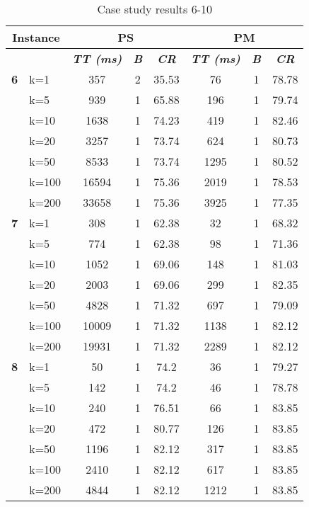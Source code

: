     \begin{table}[htbp]
    \caption{Case study results 6-10}
    \centering
    \begin{tabular}{|l|l|c|c|c|c|c|c|}
    \hline
    \multicolumn{ 2}{|c|}{\textbf{Instance}} & \multicolumn{ 3}{c|}{\textbf{PS}} & \multicolumn{ 3}{c|}{\textbf{PM}} \\ \hline
    \multicolumn{ 2}{|l|}{} & \textbf{\textit{TT (ms)}} & \textbf{\textit{B}} & \textbf{\textit{CR}} & \textbf{\textit{TT (ms)}} & \textbf{\textit{B}} & \textbf{\textit{CR}} \\ \hline
    \multicolumn{1}{|r|}{\textbf{6}} & k=1 & 357 & 2 & 35.53 & 76 & 1 & 78.78 \\ 
     & k=5 & 939 & 1 & 65.88 & 196 & 1 & 79.74 \\ 
     & k=10 & 1638 & 1 & 74.23 & 419 & 1 & 82.46 \\ 
     & k=20 & 3257 & 1 & 73.74 & 624 & 1 & 80.73 \\ 
     & k=50 & 8533 & 1 & 73.74 & 1295 & 1 & 80.52 \\ 
     & k=100 & 16594 & 1 & 75.36 & 2019 & 1 & 78.53 \\ 
     & k=200 & 33658 & 1 & 75.36 & 3925 & 1 & 77.35 \\ \hline
    \multicolumn{1}{|r|}{\textbf{7}} & k=1 & 308 & 1 & 62.38 & 32 & 1 & 68.32 \\ 
     & k=5 & 774 & 1 & 62.38 & 98 & 1 & 71.36 \\ 
     & k=10 & 1052 & 1 & 69.06 & 148 & 1 & 81.03 \\ 
     & k=20 & 2003 & 1 & 69.06 & 299 & 1 & 82.35 \\ 
     & k=50 & 4828 & 1 & 71.32 & 697 & 1 & 79.09 \\ 
     & k=100 & 10009 & 1 & 71.32 & 1138 & 1 & 82.12 \\ 
     & k=200 & 19931 & 1 & 71.32 & 2289 & 1 & 82.12 \\ \hline
    \multicolumn{1}{|r|}{\textbf{8}} & k=1 & 50 & 1 & 74.2 & 36 & 1 & 79.27 \\ 
     & k=5 & 142 & 1 & 74.2 & 46 & 1 & 78.78 \\ 
     & k=10 & 240 & 1 & 76.51 & 66 & 1 & 83.85 \\ 
     & k=20 & 472 & 1 & 80.77 & 126 & 1 & 83.85 \\ 
     & k=50 & 1196 & 1 & 82.12 & 317 & 1 & 83.85 \\ 
     & k=100 & 2410 & 1 & 82.12 & 617 & 1 & 83.85 \\ 
     & k=200 & 4844 & 1 & 82.12 & 1212 & 1 & 83.85 \\ \hline

\end{tabular}
\end{table}
